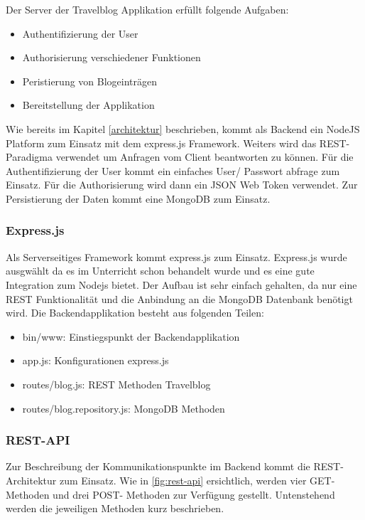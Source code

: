 \documentclass[../main.tex]{subfiles}
\begin{document}
Der Server der Travelblog Applikation erfüllt folgende Aufgaben:
\begin{itemize}
    \item Authentifizierung der User
    \item Authorisierung verschiedener Funktionen
    \item Peristierung von Blogeinträgen
    \item Bereitstellung der Applikation
\end{itemize}
Wie bereits im Kapitel \ref{architektur} beschrieben, kommt als Backend ein NodeJS Platform zum Einsatz mit dem express.js Framework. Weiters wird das REST- Paradigma verwendet um Anfragen vom Client beantworten zu können. Für die Authentifizierung der User kommt ein einfaches User/ Passwort abfrage zum Einsatz. Für die Authorisierung wird dann ein JSON Web Token verwendet. Zur Persistierung der Daten kommt eine MongoDB zum Einsatz.

\subsubsection{Express.js}
Als Serverseitiges Framework kommt express.js zum Einsatz. Express.js wurde ausgwählt da es im Unterricht schon behandelt wurde und es eine gute Integration zum Nodejs bietet. Der Aufbau ist sehr einfach gehalten, da nur eine REST Funktionalität und die Anbindung an die MongoDB Datenbank benötigt wird. Die Backendapplikation besteht aus folgenden Teilen:
\begin{itemize}
    \item bin/www: Einstiegspunkt der Backendapplikation
    \item app.js: Konfigurationen express.js
    \item routes/blog.js: REST Methoden Travelblog
    \item routes/blog.repository.js: MongoDB Methoden
\end{itemize}

\subsubsection{REST-API}
Zur Beschreibung der Kommunikationspunkte im Backend kommt die REST- Architektur zum Einsatz. Wie in \ref{fig:rest-api} ersichtlich, werden vier GET- Methoden und drei POST- Methoden zur Verfügung gestellt. Untenstehend werden die jeweiligen Methoden kurz beschrieben.
\end{document}

